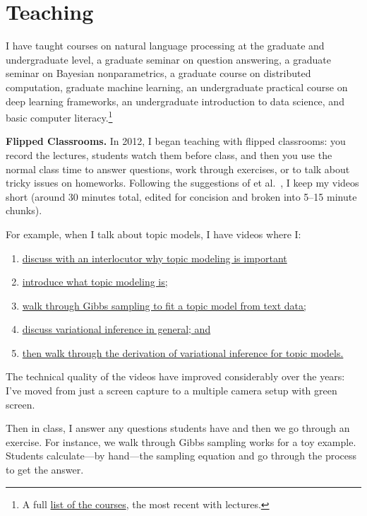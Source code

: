 \documentclass[11pt]{amsart}
\newcommand{\newcite}[2]{\capitalisewords{#1} et al.~\cite{#1-#2}}
\begin{document}
\section{Teaching}

I have taught courses on natural language processing at the graduate and undergraduate level, a graduate seminar on question answering, a graduate seminar on Bayesian nonparametrics, a graduate course on distributed computation, graduate machine learning, an undergraduate practical course on deep learning frameworks, an undergraduate introduction to data science, and basic computer literacy.\footnote{A full \href{http://users.umiacs.umd.edu/~jbg/static/courses.html}{list of the courses}, the most recent with lectures.}

{\bf Flipped Classrooms.}
%
In 2012, I began teaching with flipped classrooms: you
record the lectures, students watch them before class, and then you
use the normal class time to answer questions, work through exercises,
or to talk about tricky issues on homeworks.
%
Following the
suggestions of \newcite{Zappe}{09}, I keep my videos short (around 30
minutes total, edited for concision and broken into 5--15 minute
chunks).

For example, when I talk about topic models, I have videos where I:
  \begin{enumerate}
  \item \href{https://youtu.be/qvr5J9m7Gmw}{discuss with an interlocutor why
    topic modeling is important}
  \item \href{https://www.youtube.com/watch?v=fCmIceNqVog}{introduce what
    topic modeling is;}
  \item \href{https://youtu.be/-tKmyHoVZ-g}{walk through Gibbs sampling to fit
  a topic model from text data;}
  \item \href{https://youtu.be/-tKmyHoVZ-g}{discuss variational inference in
    general; and}
  \item \href{https://youtu.be/smfWKhDcaoA}{then walk through the derivation
    of variational inference for topic models.}
  \end{enumerate}
%
The technical quality of the videos have
improved considerably over the years: I've moved from just a screen
capture to a multiple camera setup with green screen.

Then in class, I answer any questions students have and then we go
through an exercise.
%
For instance, we walk through Gibbs sampling
works for a toy example.
%
Students calculate---by hand---the sampling
equation and go through the process to get the answer.
\end{document}
